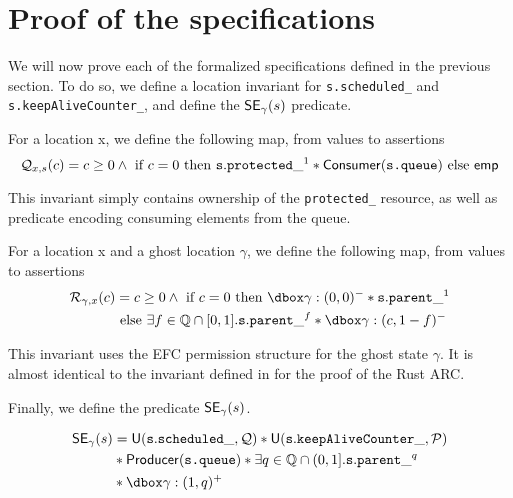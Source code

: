 \section{Proof of the specifications}
We will now prove each of the formalized specifications defined in the previous section. To do so, we define a location invariant for \texttt{s.scheduled\_} and \texttt{s.keepAliveCounter\_}, and define the $\mathsf{SE}_\gamma(s)$ predicate.


\begin{definition}
For a location x, we define the following map, from values to assertions
\[
		\mathcal{Q}_{x, s}(c) = c \geq 0 \land \text{ if } c = 0 \text{ then }\mathtt{s.protected\_}^1 * \mathsf{Consumer}(\texttt{s.queue}) \text{ else } \mathsf{emp}
\]
\end{definition}

This invariant simply contains ownership of the \texttt{protected\_} resource, as well as predicate encoding consuming elements from the queue.

\begin{definition}
For a location x and a ghost location $\gamma$, we define the following map, from values to assertions
		\begin{align*}
				\mathcal{R}_{\gamma, x}(c) &= c \geq 0 \land \text{ if } c = 0 \text{ then } \ghost{\gamma : (0, 0)^-} * \mathtt{s.parent\_}^1 \\ 
				&\text{ else } \exists f \in \mathbb{Q} \cap [0, 1]. \mathtt{s.parent\_}^f * \ghost{\gamma : (c, 1 - f)^-}
\end{align*}
\end{definition}

This invariant uses the EFC permission structure for the ghost state $\gamma$. It is almost identical to the invariant defined in \cite{gaurav} for the proof of the Rust ARC.

Finally, we define the predicate $\mathsf{SE}_\gamma(s)$.

\begin{definition}
		\begin{align*}
				\sePred &= \mathsf{U}(\mathtt{s.scheduled\_}, \mathcal{Q}) * \mathsf{U}(\mathtt{s.keepAliveCounter\_}, \mathcal{P}) \\ 
				&* \prodQ * \exists q \in \mathbb{Q} \cap (0, 1]. \mathtt{s.parent\_}^q \\
				&* \ghost{\gamma : (1, q)^+}
		\end{align*}

\end{definition}

